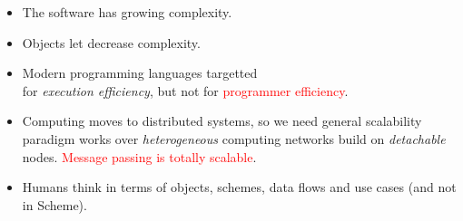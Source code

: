
\begin{itemize}[nosep]
  \item 
The software has growing complexity.
  \item 
Objects let decrease complexity.
  \item 
Modern programming languages targetted\\for \emph{execution efficiency},
but not for \textcolor{red}{programmer efficiency}.
  \item 
Computing moves to distributed systems, so we need general scalability paradigm
works over \emph{heterogeneous} computing networks build on \emph{detachable}
nodes. \textcolor{red}{Message passing is totally scalable}.
  \item 
Humans think in terms of objects, schemes, data flows and use cases (and
not in Scheme).
\end{itemize}
